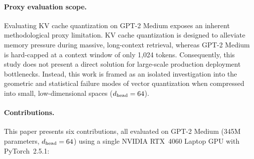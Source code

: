 \paragraph{Proxy evaluation scope.}
Evaluating KV cache quantization on GPT-2 Medium exposes an inherent methodological proxy limitation. KV cache quantization is designed to alleviate memory pressure during massive, long-context retrieval, whereas GPT-2 Medium is hard-capped at a context window of only 1{,}024 tokens. Consequently, this study does not present a direct solution for large-scale production deployment bottlenecks. Instead, this work is framed as an isolated investigation into the geometric and statistical failure modes of vector quantization when compressed into small, low-dimensional spaces ($d_{\text{head}} = 64$).

\paragraph{Contributions.}
This paper presents six contributions, all evaluated on GPT-2
Medium (345M parameters, $d_{\text{head}} = 64$) using a single NVIDIA RTX~4060
Laptop GPU with PyTorch~2.5.1:

